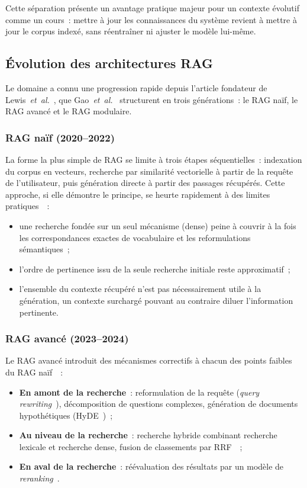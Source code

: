 \documentclass[11pt,a4paper]{article}
\begin{document}
Cette séparation présente un avantage pratique majeur pour un contexte évolutif comme un cours~: mettre à jour les connaissances du système revient à mettre à jour le corpus indexé, sans réentraîner ni ajuster le modèle lui-même.

\subsection{Évolution des architectures RAG}
\label{sec:evolution-rag}

Le domaine a connu une progression rapide depuis l'article fondateur de Lewis~\textit{et~al.}~\cite{lewis2020rag}, que Gao~\textit{et~al.}~\cite{gao2024ragsurvey} structurent en trois générations~: le RAG naïf, le RAG avancé et le RAG modulaire.

\subsubsection{RAG naïf (2020--2022)}

La forme la plus simple de RAG se limite à trois étapes séquentielles~: indexation du corpus en vecteurs, recherche par similarité vectorielle à partir de la requête de l'utilisateur, puis génération directe à partir des passages récupérés. Cette approche, si elle démontre le principe, se heurte rapidement à des limites pratiques~\cite{gao2024ragsurvey}~:
\begin{itemize}
  \item une recherche fondée sur un seul mécanisme (dense) peine à couvrir à la fois les correspondances exactes de vocabulaire et les reformulations sémantiques~;
  \item l'ordre de pertinence issu de la seule recherche initiale reste approximatif~;
  \item l'ensemble du contexte récupéré n'est pas nécessairement utile à la génération, un contexte surchargé pouvant au contraire diluer l'information pertinente.
\end{itemize}

\subsubsection{RAG avancé (2023--2024)}

Le RAG avancé introduit des mécanismes correctifs à chacun des points faibles du RAG naïf~\cite{gao2024ragsurvey,wang2024bestpractices}~:
\begin{itemize}
  \item \textbf{En amont de la recherche}~: reformulation de la requête (\textit{query rewriting}~\cite{ma2023queryrewriting}), décomposition de questions complexes, génération de documents hypothétiques (HyDE~\cite{gao2022hyde})~;
  \item \textbf{Au niveau de la recherche}~: recherche hybride combinant recherche lexicale et recherche dense, fusion de classements par RRF~\cite{cormack2009rrf}~;
  \item \textbf{En aval de la recherche}~: réévaluation des résultats par un modèle de \textit{reranking}~\cite{nogueira2019bert}.
\end{itemize}
\end{document}
